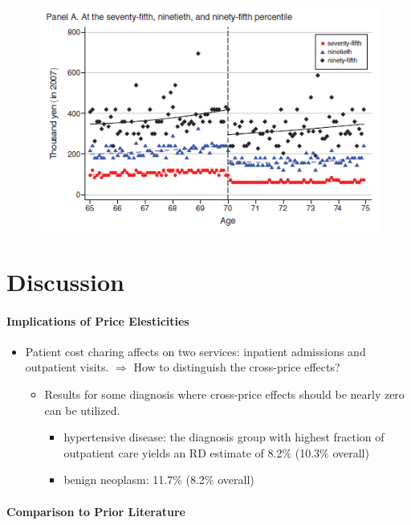 \documentclass[../root]{subfiles}
\begin{document}
    \begin{figure}[ht]
      \centering
      \includegraphics[scale = 1]{0710tanji/F7a}
    \end{figure}

    \section{Discussion}

    \paragraph{Implications of Price Elesticities}

    \begin{itemize}
      \item Patient cost charing affects on two services: inpatient admissions and outpatient visits.
      $\Rightarrow$ How to distinguish the cross-price effects?
      \begin{itemize}
        \item Results for some diagnosis where cross-price effects should be nearly zero can be utilized.
        \begin{itemize}
          \item hypertensive disease: the diagnosis group with highest fraction of outpatient care yields an RD estimate of 8.2\% (10.3\% overall)
          \item benign neoplasm: 11.7\% (8.2\% overall)
        \end{itemize}
      \end{itemize}
    \end{itemize}

    \paragraph{Comparison to Prior Literature}
\end{document}
